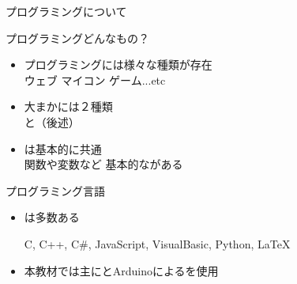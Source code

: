 \documentclass[dvipdfmx]{beamer}
\begin{document}
  \begin{frame}{プログラミングについて}
    \begin{large}プログラミングどんなもの？\end{large}
    \begin{itemize}
      \setlength{\itemsep}{3mm}
      \item プログラミングには様々な種類が存在\\ウェブ マイコン ゲーム...etc
      \item 大まかには２種類\\と（後述）
      \item {}は基本的に共通\\関数や変数など 基本的ながある
    \end{itemize}
    \vfill
    \begin{large}プログラミング言語\end{large}
    \begin{itemize}
      \setlength{\itemsep}{3mm}
      \item {}は多数ある\par C, C++, C\#, JavaScript, VisualBasic, Python, \LaTeX
      \item 本教材では主にとArduinoによるを使用
    \end{itemize}
  \end{frame}
\end{document}
